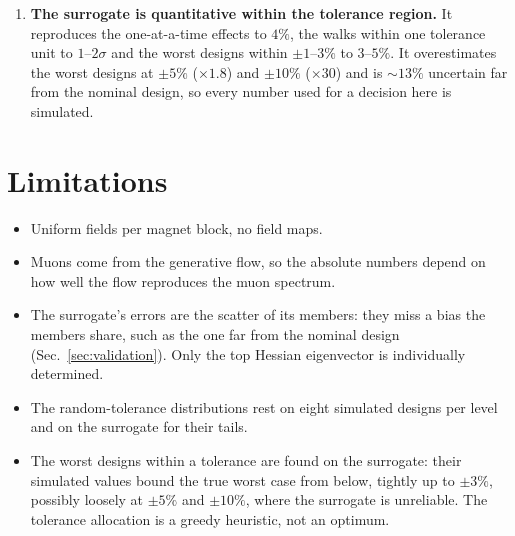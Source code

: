 \documentclass[11pt,a4paper]{article}
\begin{document}
\begin{enumerate}
        $30$--$75$\,GeV ($66\%$) and above $150$\,GeV ($24\%$). Every harmful direction near the
        nominal design acts through the first group, while the high-momentum hits fall; the
        reverse direction raises the soft and high-momentum hits instead. The dominant
        active-subspace direction (the lengths and fields of M1--M4) trades hits between the
        groups and is harmful on both sides.
  \item \textbf{The surrogate is quantitative within the tolerance region.} It reproduces the
        one-at-a-time effects to $4\%$, the walks within one tolerance unit to $1$--$2\sigma$ and
        the worst designs within $\pm1$--$3\%$ to $3$--$5\%$. It overestimates the worst designs
        at $\pm5\%$ ($\times1.8$) and $\pm10\%$ ($\times30$) and is $\sim13\%$ uncertain far from
        the nominal design, so every number used for a decision here is simulated.
\end{enumerate}

\section*{Limitations}
\begin{itemize}
  \item Uniform fields per magnet block, no field maps.
  \item Muons come from the generative flow, so the absolute numbers depend on how well the flow
        reproduces the muon spectrum.
  \item The surrogate's errors are the scatter of its members: they miss a bias the members
        share, such as the one far from the nominal design (Sec.~\ref{sec:validation}). Only the
        top Hessian eigenvector is individually determined.
  \item The random-tolerance distributions rest on eight simulated designs per level and on the
        surrogate for their tails.
  \item The worst designs within a tolerance are found on the surrogate: their simulated values
        bound the true worst case from below, tightly up to $\pm3\%$, possibly loosely at $\pm5\%$
        and $\pm10\%$, where the surrogate is unreliable. The tolerance allocation is a greedy
        heuristic, not an optimum.
\end{itemize}

\clearpage
\appendix
\end{document}
